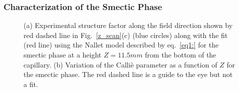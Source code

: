 \documentclass[aps,prl,preprint,superscriptaddress,showkeys]{revtex4-2} %
\begin{document}
\subsubsection{Characterization of the Smectic Phase}
\begin{figure}[ht]
\caption{(a) Experimental structure factor along the field direction shown by red dashed line in Fig.~\ref{z_scan}(c) (blue circles) along with the fit (red line) using the Nallet model described by eq.~\ref{eq1:} for the smectic phase at a height $Z=11.5 mm$ from the bottom of the capillary. (b) Variation of the Calli\`{e} parameter as a function of $Z$ for the smectic phase. The red dashed line is a guide to the eye but not a fit.}\label{callie}
\end{figure}
\end{document}
